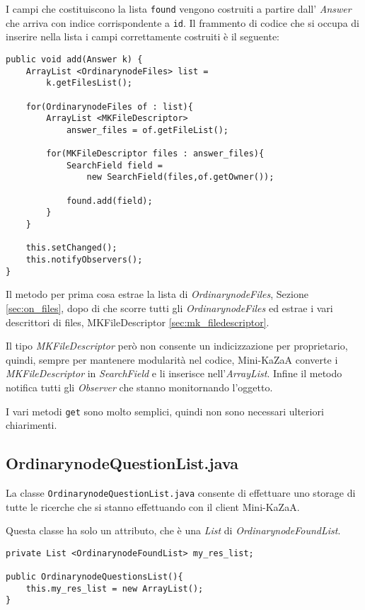 I campi che costituiscono la lista \verb|found| vengono costruiti a partire dall' \emph{Answer} che arriva con indice corrispondente a \verb|id|.
Il frammento di codice che si occupa di inserire nella lista i campi correttamente costruiti è il seguente:
\begin{lstlisting}
public void add(Answer k) {
	ArrayList <OrdinarynodeFiles> list = 
		k.getFilesList();

	for(OrdinarynodeFiles of : list){
		ArrayList <MKFileDescriptor> 
			answer_files = of.getFileList();
			
		for(MKFileDescriptor files : answer_files){
			SearchField field = 
				new SearchField(files,of.getOwner());

			found.add(field);
		}
	}

	this.setChanged();
	this.notifyObservers();
}
\end{lstlisting}
Il metodo per prima cosa estrae la lista di \emph{OrdinarynodeFiles}, Sezione \ref{sec:on_files}, dopo di che scorre tutti gli \emph{OrdinarynodeFiles} ed estrae i vari descrittori di files, MKFileDescriptor \ref{sec:mk_filedescriptor}.

Il tipo \emph{MKFileDescriptor} però non consente un indicizzazione per proprietario, quindi, sempre per mantenere modularità nel codice, Mini-KaZaA converte i \emph{MKFileDescriptor} in \emph{SearchField} e li inserisce nell'\emph{ArrayList}.
Infine il metodo notifica tutti gli \emph{Observer} che stanno monitornando l'oggetto.

I vari metodi \verb|get| sono molto semplici, quindi non sono necessari ulteriori chiarimenti.

\subsection{OrdinarynodeQuestionList.java}
La classe \verb|OrdinarynodeQuestionList.java| consente di effettuare uno storage di tutte le ricerche che si stanno effettuando con il client Mini-KaZaA.

Questa classe ha solo un attributo, che è una \emph{List} di \emph{OrdinarynodeFoundList}.
\begin{lstlisting}
private List <OrdinarynodeFoundList> my_res_list;

public OrdinarynodeQuestionsList(){
	this.my_res_list = new ArrayList();
}
\end{lstlisting}

